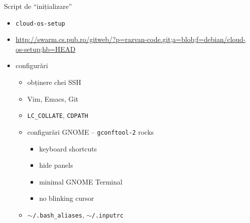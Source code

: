 \documentclass{simple}
\begin{document}
\begin{frame}{Script de ``inițializare''}
  \begin{itemize}
    \item \texttt{cloud-os-setup}
    \item
    \url{http://swarm.cs.pub.ro/gitweb/?p=razvan-code.git;a=blob;f=debian/cloud-os-setup;hb=HEAD}
    \item configurări
      \begin{itemize}
        \item obținere chei SSH
        \item Vim, Emacs, Git
        \item \texttt{LC\_COLLATE}, \texttt{CDPATH}
        \item configurări GNOME -- \texttt{gconftool-2} rocks
          \begin{itemize}
            \item keyboard shortcuts
            \item hide panels
            \item minimal GNOME Terminal
            \item no blinking cursor
          \end{itemize}
        \item \texttt{$\sim$/.bash\_aliases}, \texttt{$\sim$/.inputrc}
      \end{itemize}
  \end{itemize}
\end{frame}
\end{document}
